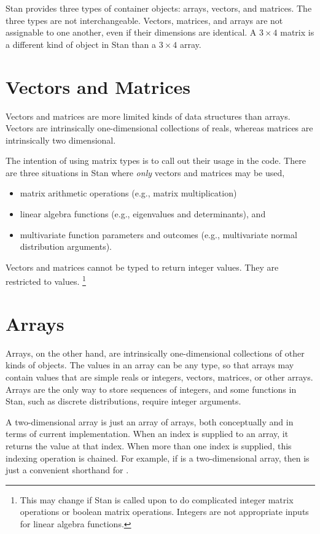 \noindent
Stan provides three types of container objects: arrays, vectors, and
matrices.  The three types are not interchangeable.  Vectors, matrices,
and arrays are not assignable to one another, even if their dimensions
are identical.  A $3 \times 4$ matrix is a different kind of object in
Stan than a $3 \times 4$ array. 

\section{Vectors and Matrices}

Vectors and matrices are more limited kinds of data structures than
arrays.  Vectors are intrinsically one-dimensional collections of
reals, whereas matrices are intrinsically two dimensional. 

The intention of using matrix types is to call out their usage in the
code.  There are three situations in Stan where {\it only} vectors and
matrices may be used,
%
\begin{itemize}
\item matrix arithmetic operations (e.g., matrix multiplication)
\item linear algebra functions (e.g., eigenvalues and determinants),
  and
\item multivariate function parameters and outcomes (e.g.,
  multivariate normal distribution arguments).
\end{itemize}
%

Vectors and matrices cannot be typed to return integer values.  They
are restricted to  values.%
%
\footnote{This may change if Stan is called upon to do complicated
  integer matrix operations or boolean matrix operations.  Integers
  are not appropriate inputs for linear algebra functions.}

\section{Arrays}

Arrays, on the other hand, are intrinsically one-dimensional
collections of other kinds of objects.  The values in an array can be
any type, so that arrays may contain values that are simple reals or
integers, vectors, matrices, or other arrays.  Arrays are the only way
to store sequences of integers, and some functions in Stan, such as
discrete distributions, require integer arguments. 


A two-dimensional array is just an array of arrays, both conceptually
and in terms of current implementation.  When an index is supplied to
an array, it returns the value at that index.  When more than one
index is supplied, this indexing operation is chained.  For example, if
 is a two-dimensional array, then  is just
a convenient shorthand for .


